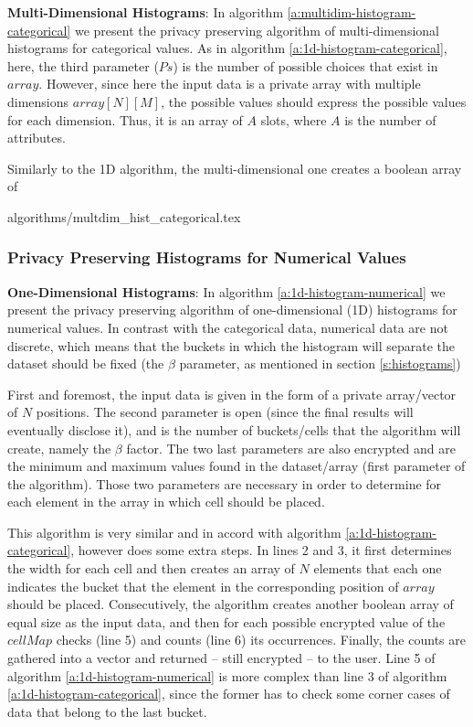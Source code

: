 \textbf{Multi-Dimensional Histograms}: In algorithm \ref{a:multidim-histogram-categorical} we present the privacy preserving algorithm of multi-dimensional histograms for categorical values.
As in algorithm \ref{a:1d-histogram-categorical}, here, the third parameter ($Ps$) is the number of possible choices that exist in $array$.
However, since here the input data is a private array with multiple dimensions $array[N][M]$, the possible values should express the possible values for each dimension.
Thus, it is an array of $A$ slots, where $A$ is the number of attributes.

Similarly to the 1D algorithm, the multi-dimensional one creates a boolean array of 

{algorithms/multdim_hist_categorical.tex}



\subsubsection{Privacy Preserving Histograms for Numerical Values}\label{sss:histogram-numerical}

\textbf{One-Dimensional Histograms}: In algorithm \ref{a:1d-histogram-numerical} we present the privacy preserving algorithm of one-dimensional (1D) histograms for numerical values.
In contrast with the categorical data, numerical data are not discrete, which means that the buckets in which the histogram will separate the dataset should be fixed (the $\beta$ parameter, as mentioned in section \ref{s:histograms})

First and foremost, the input data is given in the form of a private array/vector of $N$ positions.
The second parameter is open (since the final results will eventually disclose it), and is the number of buckets/cells that the algorithm will create, namely the $\beta$ factor.
The two last parameters are also encrypted and are the minimum and maximum values found in the dataset/array (first parameter of the algorithm).
Those two parameters are necessary in order to determine for each element in the array in which cell should be placed.

This algorithm is very similar and in accord with algorithm \ref{a:1d-histogram-categorical}, however does some extra steps.
In lines 2 and 3, it first determines the width for each cell and then creates an array of $N$ elements that each one indicates the bucket that the element in the corresponding position of $array$ should be placed.
Consecutively, the algorithm creates another boolean array of equal size as the input data, and then for each possible encrypted value of the $cellMap$ checks (line 5) and counts (line 6) its occurrences.
Finally, the counts are gathered into a vector and returned -- still encrypted -- to the user.
Line 5 of algorithm \ref{a:1d-histogram-numerical} is more complex than line 3 of algorithm \ref{a:1d-histogram-categorical}, since the former has to check some corner cases of data that belong to the last bucket.

